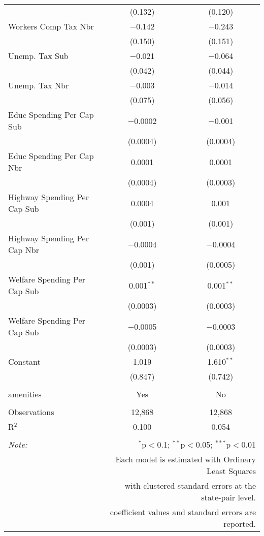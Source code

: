 \begin{table}[!htbp]
\begin{tabular}{@{\extracolsep{5pt}}lcc}
  & (0.132) & (0.120) \\ 
  Workers Comp Tax Nbr & $-$0.142 & $-$0.243 \\ 
  & (0.150) & (0.151) \\ 
  Unemp. Tax Sub & $-$0.021 & $-$0.064 \\ 
  & (0.042) & (0.044) \\ 
  Unemp. Tax Nbr & $-$0.003 & $-$0.014 \\ 
  & (0.075) & (0.056) \\ 
  Educ Spending Per Cap Sub & $-$0.0002 & $-$0.001 \\ 
  & (0.0004) & (0.0004) \\ 
  Educ Spending Per Cap Nbr & 0.0001 & 0.0001 \\ 
  & (0.0004) & (0.0003) \\ 
  Highway Spending Per Cap Sub & 0.0004 & 0.001 \\ 
  & (0.001) & (0.001) \\ 
  Highway Spending Per Cap Nbr & $-$0.0004 & $-$0.0004 \\ 
  & (0.001) & (0.0005) \\ 
  Welfare Spending Per Cap Sub & 0.001$^{**}$ & 0.001$^{**}$ \\ 
  & (0.0003) & (0.0003) \\ 
  Welfare Spending Per Cap Sub & $-$0.0005 & $-$0.0003 \\ 
  & (0.0003) & (0.0003) \\ 
  Constant & 1.019 & 1.610$^{**}$ \\ 
  & (0.847) & (0.742) \\ 
 \hline \\[-1.8ex] 
amenities & Yes & No \\ 
\hline \\[-1.8ex] 
Observations & 12,868 & 12,868 \\ 
R$^{2}$ & 0.100 & 0.054 \\ 
\hline 
\hline \\[-1.8ex] 
\textit{Note:}  & \multicolumn{2}{r}{$^{*}$p$<$0.1; $^{**}$p$<$0.05; $^{***}$p$<$0.01} \\ 
 & \multicolumn{2}{r}{Each model is estimated with Ordinary Least Squares} \\ 
 & \multicolumn{2}{r}{with clustered standard errors at the state-pair level.} \\ 
 & \multicolumn{2}{r}{coefficient values and standard errors are reported.} \\ 
\end{tabular} 
\end{table} 
